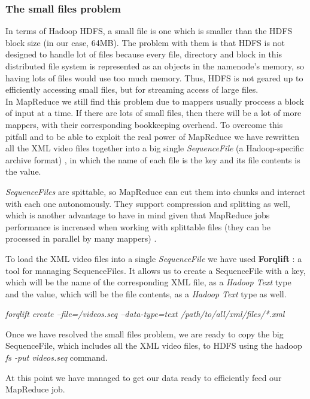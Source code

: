 \subsubsection{The small files problem}
In terms of Hadoop HDFS, a small file is one which is smaller than the HDFS block size (in our case, 64MB). The problem with them is that HDFS is not designed to handle lot of files because every file, directory and block in this distributed file system is represented as an objects in the namenode's memory, so having lots of files would use too much memory. Thus, HDFS is not geared up to efficiently accessing small files, but for streaming access of large files. 
\\
In MapReduce we still find this problem due to mappers usually proccess a block of input at a time. If there are lots of small files, then there will be a lot of more mappers, with their corresponding bookkeeping overhead. To overcome this pitfall and to be able to exploit the real power of MapReduce we have rewritten all the XML video files together into a big single \textit{SequenceFile} (a Hadoop-specific archive format) \cite{ApacheHadoopSequenceFile}, in which the name of each file is the key and its file contents is the value. 
\par
\textit{SequenceFiles} are spittable, so MapReduce can cut them into chunks and interact with each one autonomously. They support compression and splitting as well, which is another advantage to have in mind given that MapReduce jobs performance is increased when working with splittable files (they can be processed in parallel by many mappers)  \cite{SmallFiles}.
\par
{}
\par
To load the XML video files into a single \textit{SequenceFile} we have used \textbf{Forqlift} \cite{Forqlift}: a tool for managing SequenceFiles. It allows us to create a SequenceFile with a key, which will be the name of the corresponding XML file, as a \textit{Hadoop Text} type and the value, which will be the file contents, as a \textit{Hadoop Text} type as well.

\centerline{\textit{forqlift create --file=/videos.seq --data-type=text /path/to/all/xml/files/*.xml} }
\par

Once we have resolved the small files problem, we are ready to copy the big SequenceFile, which includes all the XML video files, to HDFS using the hadoop \textit{fs -put videos.seq} command. 
\par
{}
\par
At this point we have managed to get our data ready to efficiently feed our MapReduce job.
\par

